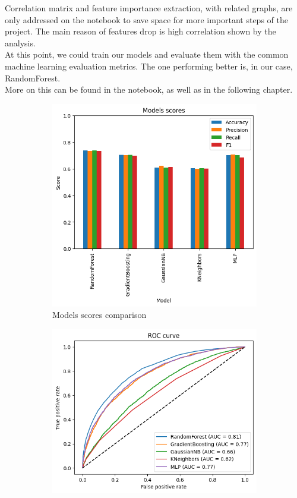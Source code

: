 Correlation matrix and feature importance extraction, with related graphs, are only addressed on the notebook to save space for more important steps of the project. The main reason of features drop is high correlation shown by the analysis. \\
At this point, we could train our models and evaluate them with the common machine learning evaluation metrics. The one performing better is, in our case, RandomForest.\\More on this can be found in the notebook, as well as in the following chapter.

\begin{figure}[H]
  \centering
  \begin{subfigure}{0.45\textwidth}
    \centering
    \includegraphics[width=\textwidth]{images/models_scores.png}
    \caption{Models scores comparison}
    \label{fig:immagine1}
  \end{subfigure}
  \hfill
  \begin{subfigure}{0.45\textwidth}
    \centering
    \includegraphics[width=\textwidth]{images/roc_curves.png}

\end{subfigure}
\end{figure}
